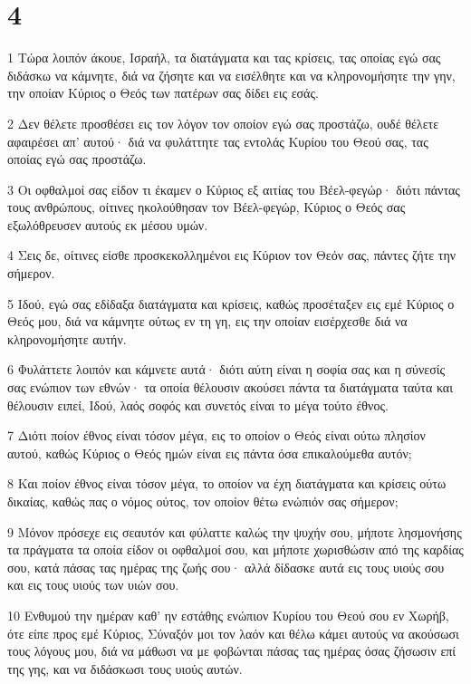 \chapter{4}

\par 1 Τώρα λοιπόν άκουε, Ισραήλ, τα διατάγματα και τας κρίσεις, τας οποίας εγώ σας διδάσκω να κάμνητε, διά να ζήσητε και να εισέλθητε και να κληρονομήσητε την γην, την οποίαν Κύριος ο Θεός των πατέρων σας δίδει εις εσάς.
\par 2 Δεν θέλετε προσθέσει εις τον λόγον τον οποίον εγώ σας προστάζω, ουδέ θέλετε αφαιρέσει απ' αυτού· διά να φυλάττητε τας εντολάς Κυρίου του Θεού σας, τας οποίας εγώ σας προστάζω.
\par 3 Οι οφθαλμοί σας είδον τι έκαμεν ο Κύριος εξ αιτίας του Βέελ-φεγώρ· διότι πάντας τους ανθρώπους, οίτινες ηκολούθησαν τον Βέελ-φεγώρ, Κύριος ο Θεός σας εξωλόθρευσεν αυτούς εκ μέσου υμών.
\par 4 Σεις δε, οίτινες είσθε προσκεκολλημένοι εις Κύριον τον Θεόν σας, πάντες ζήτε την σήμερον.
\par 5 Ιδού, εγώ σας εδίδαξα διατάγματα και κρίσεις, καθώς προσέταξεν εις εμέ Κύριος ο Θεός μου, διά να κάμνητε ούτως εν τη γη, εις την οποίαν εισέρχεσθε διά να κληρονομήσητε αυτήν.
\par 6 Φυλάττετε λοιπόν και κάμνετε αυτά· διότι αύτη είναι η σοφία σας και η σύνεσίς σας ενώπιον των εθνών· τα οποία θέλουσιν ακούσει πάντα τα διατάγματα ταύτα και θέλουσιν ειπεί, Ιδού, λαός σοφός και συνετός είναι το μέγα τούτο έθνος.
\par 7 Διότι ποίον έθνος είναι τόσον μέγα, εις το οποίον ο Θεός είναι ούτω πλησίον αυτού, καθώς Κύριος ο Θεός ημών είναι εις πάντα όσα επικαλούμεθα αυτόν;
\par 8 Και ποίον έθνος είναι τόσον μέγα, το οποίον να έχη διατάγματα και κρίσεις ούτω δικαίας, καθώς πας ο νόμος ούτος, τον οποίον θέτω ενώπιόν σας σήμερον;
\par 9 Μόνον πρόσεχε εις σεαυτόν και φύλαττε καλώς την ψυχήν σου, μήποτε λησμονήσης τα πράγματα τα οποία είδον οι οφθαλμοί σου, και μήποτε χωρισθώσιν από της καρδίας σου, κατά πάσας τας ημέρας της ζωής σου· αλλά δίδασκε αυτά εις τους υιούς σου και εις τους υιούς των υιών σου.
\par 10 Ενθυμού την ημέραν καθ' ην εστάθης ενώπιον Κυρίου του Θεού σου εν Χωρήβ, ότε είπε προς εμέ Κύριος, Σύναξόν μοι τον λαόν και θέλω κάμει αυτούς να ακούσωσι τους λόγους μου, διά να μάθωσι να με φοβώνται πάσας τας ημέρας όσας ζήσωσιν επί της γης, και να διδάσκωσι τους υιούς αυτών.
